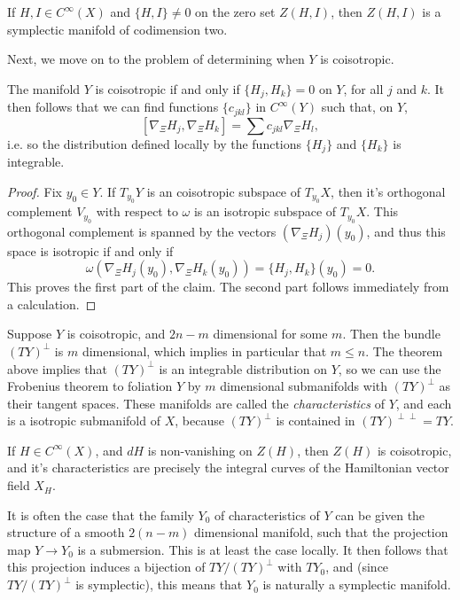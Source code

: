 \begin{example}
    If $H,I \in C^\infty(X)$ and $\{ H, I \} \neq 0$ on the zero set $Z(H,I)$, then $Z(H,I)$ is a symplectic manifold of codimension two.
\end{example}

Next, we move on to the problem of determining when $Y$ is coisotropic.

\begin{theorem}
    The manifold $Y$ is coisotropic if and only if $\{ H_j, H_k \} = 0$ on $Y$, for all $j$ and $k$. It then follows that we can find functions $\{ c_{jkl} \}$ in $C^\infty(Y)$ such that, on $Y$,
    \[ [ \nabla_\Xi H_j, \nabla_\Xi H_k ] = \sum c_{jkl} \nabla_\Xi H_l, \]
    i.e. so the distribution defined locally by the functions $\{ H_j \}$ and $\{ H_k \}$ is integrable.
\end{theorem}
\begin{proof}
    Fix $y_0 \in Y$. If $T_{y_0} Y$ is an coisotropic subspace of $T_{y_0} X$, then it's orthogonal complement $V_{y_0}$ with respect to $\omega$ is an isotropic subspace of $T_{y_0} X$. This orthogonal complement is spanned by the vectors $(\nabla_\Xi H_j)(y_0)$, and thus this space is isotropic if and only if
    \[ \omega(\nabla_\Xi H_j(y_0), \nabla_\Xi H_k(y_0)) = \{ H_j, H_k \}(y_0) = 0. \]
    This proves the first part of the claim. The second part follows immediately from a calculation.
\end{proof}

Suppose $Y$ is coisotropic, and $2n - m$ dimensional for some $m$. Then the bundle $(TY)^\perp$ is $m$ dimensional, which implies in particular that $m \leq n$. The theorem above implies that $(TY)^\perp$ is an integrable distribution on $Y$, so we can use the Frobenius theorem to foliation $Y$ by $m$ dimensional submanifolds with $(TY)^\perp$ as their tangent spaces. These manifolds are called the \emph{characteristics} of $Y$, and each is a isotropic submanifold of $X$, because $(TY)^\perp$ is contained in $(TY)^{\perp \perp} = TY$.

\begin{example}
    If $H \in C^\infty(X)$, and $dH$ is non-vanishing on $Z(H)$, then $Z(H)$ is coisotropic, and it's characteristics are precisely the integral curves of the Hamiltonian vector field $X_H$.
\end{example}

It is often the case that the family $Y_0$ of characteristics of $Y$ can be given the structure of a smooth $2(n-m)$ dimensional manifold, such that the projection map $Y \to Y_0$ is a submersion. This is at least the case locally. It then follows that this projection induces a bijection of $TY / (TY)^\perp$ with $TY_0$, and (since $TY / (TY)^\perp$ is symplectic), this means that $Y_0$ is naturally a symplectic manifold.

